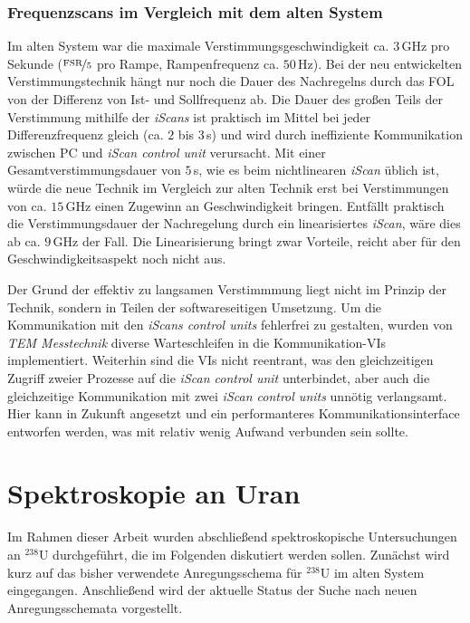 \subsubsection{Frequenzscans im
Vergleich mit dem alten
System}\label{subsubsec:frequenz_scans_vergleich_mit_altem_system}
Im alten System war die maximale Verstimmungsgeschwindigkeit ca. $3\,$GHz pro
Sekunde ($\nicefrac{\text{FSR}}{5}$ pro Rampe, Rampenfrequenz ca. $50\,$Hz). Bei
der neu entwickelten Verstimmungstechnik hängt nur noch die Dauer des
Nachregelns durch das FOL von der Differenz von Ist- und Sollfrequenz ab. Die
Dauer des großen Teils der Verstimmung mithilfe der \textit{iScans} ist praktisch im Mittel bei jeder Differenzfrequenz gleich (ca. $2$ bis $3\,$s) und
wird durch ineffiziente Kommunikation zwischen PC und \textit{iScan control
unit} verursacht. Mit einer Gesamtverstimmungsdauer von $5\,$s, wie es beim
nichtlinearen \textit{iScan} üblich ist, würde die neue Technik im
Vergleich zur alten Technik erst bei Verstimmungen von ca. $15\,$GHz einen
Zugewinn an Geschwindigkeit bringen.
Entfällt praktisch die Verstimmungsdauer der Nachregelung durch ein
linearisiertes \textit{iScan}, wäre dies ab ca. $9\,$GHz der Fall.
Die Linearisierung bringt zwar Vorteile, reicht aber für den
Geschwindigkeitsaspekt noch nicht aus.\par
Der Grund der effektiv zu langsamen Verstimmmung liegt nicht im Prinzip der
Technik, sondern in Teilen der softwareseitigen Umsetzung. Um die Kommunikation
mit den \textit{iScans control units} fehlerfrei zu gestalten, wurden von \textit{TEM
Messtechnik} diverse Warteschleifen in die Kommunikation-VIs implementiert.
Weiterhin sind die VIs nicht reentrant, was den gleichzeitigen Zugriff zweier Prozesse auf die \textit{iScan control unit}
unterbindet, aber auch die gleichzeitige Kommunikation mit zwei \textit{iScan
control units} unnötig verlangsamt. Hier kann in Zukunft angesetzt
und ein performanteres Kommunikationsinterface entworfen werden, was mit relativ
wenig Aufwand verbunden sein sollte.

\section{Spektroskopie an Uran}\label{sec:spektroskopie}
Im Rahmen dieser Arbeit wurden abschließend spektroskopische
Untersuchungen an $^{238}$U durchgeführt, die im Folgenden diskutiert werden
sollen. Zunächst wird kurz auf das bisher verwendete Anregungsschema für
$^{238}$U im alten System eingegangen. Anschließend wird der aktuelle Status
der Suche nach neuen Anregungsschemata vorgestellt.

